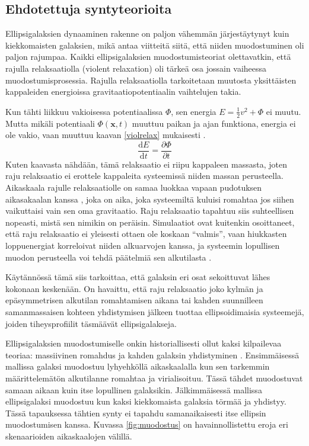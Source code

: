\documentclass[12pt,a4paper]{article}
\begin{document}
\subsection{Ehdotettuja syntyteorioita}

Ellipsigalaksien dynaaminen rakenne on paljon vähemmän järjestäytynyt kuin kiekkomaisten galaksien, mikä antaa viitteitä siitä, että niiden muodostuminen oli paljon rajumpaa. Kaikki ellipsigalaksien muodostumisteoriat olettavatkin, että rajulla relaksaatiolla (violent relaxation) oli tärkeä osa jossain vaiheessa muodostumisprosessia. Rajulla relaksaatiolla tarkoitetaan muutosta yksittäisten kappaleiden energioissa gravitaatiopotentiaalin vaihtelujen takia.

Kun tähti liikkuu vakioisessa potentiaalissa $\Phi$, sen energia $E = \frac{1}{2} v^2 + \Phi$ ei muutu. Mutta mikäli potentiaali $\Phi(\textbf{x}, t)$ muuttuu paikan ja ajan funktiona, energia ei ole vakio, vaan muuttuu kaavan \ref{violrelax} mukaisesti \citep{galdyn}.
\begin{equation} \label{violrelax}
\frac{\mathrm{d}E}{\mathrm{d}t} = \frac{\partial \Phi}{\partial t}
\end{equation}
Kuten kaavasta nähdään, tämä relaksaatio ei riipu kappaleen massasta, joten raju relaksaatio ei erottele kappaleita systeemissä niiden massan perusteella. Aikaskaala rajulle relaksaatiolle on samaa luokkaa vapaan pudotuksen aikasakaalan kanssa \citep{bell:1967}, joka on aika, joka systeemiltä kuluisi romahtaa jos siihen vaikuttaisi vain sen oma gravitaatio. Raju relaksaatio tapahtuu siis suhteellisen nopeasti, mistä sen nimikin on peräisin. Simulaatiot ovat kuitenkin osoittaneet, että raju relaksaatio ei yleisesti ottaen ole koskaan ``valmis'', vaan hiukkasten loppuenergiat korreloivat niiden alkuarvojen kanssa, ja systeemin lopullisen muodon perusteella voi tehdä päätelmiä sen alkutilasta \citep{aarseth:1978, white:1978, albada:1982, may:1984}.

Käytännössä tämä siis tarkoittaa, että galaksin eri osat sekoittuvat lähes kokonaan keskenään. On havaittu, että raju relaksaatio joko kylmän ja epäsymmetrisen alkutilan romahtamisen aikana tai kahden suunnilleen samanmassaisen kohteen yhdistymisen jälkeen tuottaa  ellipsoidimaisia systeemejä, joiden tiheysprofiilit täsmäävät ellipsigalakseja.

Ellipsigalaksien muodostumiselle onkin historiallisesti ollut kaksi kilpailevaa teoriaa: massiivinen romahdus ja kahden galaksin yhdistyminen \citep{galform}. Ensimmäisessä mallissa galaksi muodostuu lyhyehköllä aikaskaalalla kun sen tarkemmin määrittelemätön alkutilanne romahtaa ja virialisoituu. Tässä tähdet muodostuvat samaan aikaan kuin itse lopullinen galaksikin. Jälkimmäisessä mallissa ellipsigalaksi muodostuu kun kaksi kiekkomaista galaksia törmää ja yhdistyy. Tässä tapauksessa tähtien synty ei tapahdu samanaikaisesti itse ellipsin muodostumisen kanssa. Kuvassa \ref{fig:muodostus} on havainnollistettu eroja eri skenaarioiden aikaskaalojen välillä.
\end{document}

